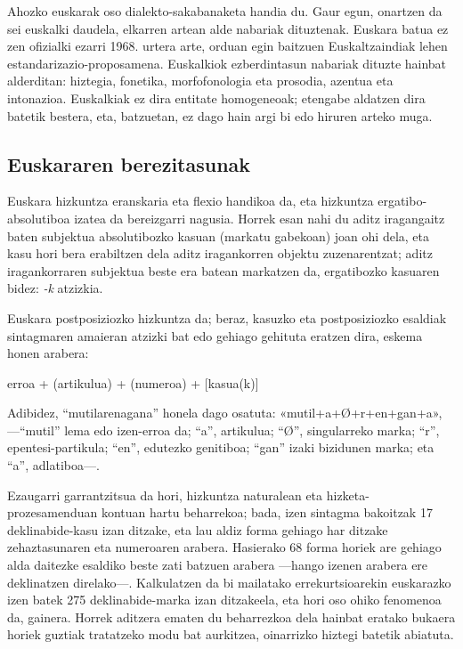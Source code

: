 \begin{multicols}{2}
Ahozko euskarak oso dialekto-sakabanaketa handia du. Gaur egun, onartzen da sei euskalki daudela, elkarren artean alde nabariak dituztenak. Euskara batua ez zen ofizialki ezarri 1968. urtera arte, orduan egin baitzuen Euskaltzaindiak \cite{BAS-Nota7}  lehen estandarizazio-proposamena. Euskalkiok ezberdintasun nabariak dituzte hainbat alderditan: hiztegia, fonetika, morfofonologia eta prosodia, azentua eta intonazioa. Euskalkiak ez dira entitate homogeneoak; etengabe aldatzen dira batetik bestera, eta, batzuetan, ez dago hain argi bi edo hiruren arteko muga.

\subsection{Euskararen berezitasunak}
   Euskara hizkuntza eranskaria eta flexio handikoa da, eta hizkuntza ergatibo-absolutiboa izatea da bereizgarri nagusia. Horrek esan nahi du aditz iragangaitz baten subjektua absolutibozko kasuan (markatu gabekoan) joan ohi dela, eta kasu hori bera erabiltzen dela aditz iragankorren objektu zuzenarentzat; aditz iragankorraren subjektua beste era batean markatzen da, ergatibozko kasuaren bidez: \textit{-k} atzizkia.


Euskara postposiziozko hizkuntza da; beraz, kasuzko eta postposiziozko esaldiak sintagmaren amaieran atzizki bat edo gehiago gehituta eratzen dira, eskema honen arabera:

\hspace{10pt}erroa + (artikulua) + (numeroa) + [kasua(k)]

Adibidez, “mutilarenagana” honela dago osatuta: «mutil+a+Ø+r\-+en+gan+a», —“mutil” lema edo izen-erroa da; “a”, artikulua; “Ø”, singularreko marka; “r”, epentesi-partikula; “en”, edutezko genitiboa; “gan” izaki bizidunen marka; eta “a”, adlatiboa—.

Ezaugarri garrantzitsua da hori, hizkuntza naturalean eta hizketa-prozesamenduan kontuan hartu beharrekoa; bada, izen sintagma bakoitzak 17 deklinabide-kasu izan ditzake, eta lau aldiz forma gehiago har ditzake zehaztasunaren eta numeroaren arabera. Hasierako 68 forma horiek are gehiago alda daitezke esaldiko beste zati batzuen arabera —hango izenen arabera ere deklinatzen direlako—. Kalkulatzen da bi mailatako errekurtsioarekin euskarazko izen batek 275 deklinabide-marka izan ditzakeela, eta hori oso ohiko fenomenoa \cite{BAS-Nota8}  da, gainera. Horrek aditzera ematen du beharrezkoa dela hainbat eratako bukaera horiek guztiak tratatzeko modu bat aurkitzea, oinarrizko hiztegi batetik abiatuta. 


\end{multicols}
